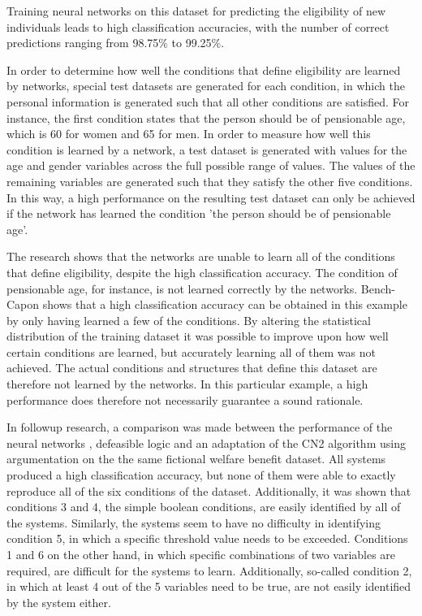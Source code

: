 \documentclass[letterpaper]{article} %
\begin{document}
\noindent Training neural networks on this dataset for predicting the eligibility of new individuals leads to high classification accuracies, with the number of correct predictions ranging from 98.75\% to 99.25\%. 

In order to determine how well the conditions that define eligibility are learned by networks, special test datasets are generated for each condition, in which the personal information is generated such that all other conditions are satisfied. For instance, the first condition states that the person should be of pensionable age, which is 60 for women and 65 for men. In order to measure how well this condition is learned by a network, a test dataset is generated with values for the age and gender variables across the full possible range of values. The values of the remaining variables are generated such that they satisfy the other five conditions. In this way, a high performance on the resulting test dataset can only be achieved if the network has learned the condition 'the person should be of pensionable age'.

The research shows that the networks are unable to learn all of the conditions that define eligibility, despite the high classification accuracy. The condition of pensionable age, for instance, is not learned correctly by the networks. Bench-Capon shows that a high classification accuracy can be obtained in this example by only having learned a few of the conditions. By altering the statistical distribution of the training dataset it was possible to improve upon how well certain conditions are learned, but accurately learning all of them was not achieved. The actual conditions and structures that define this dataset are therefore not learned by the networks. In this particular example, a high performance does therefore not necessarily guarantee a sound rationale.

In followup research, a comparison was made between the performance of the neural networks \cite{bench1993neural},  defeasible logic \cite{johnston2003induction} and an adaptation of the CN2 algorithm using argumentation \cite{movzina2005argument} on the the same fictional welfare benefit dataset. All systems produced a high classification accuracy, but none of them were able to exactly reproduce all of the six conditions of the dataset. Additionally, it was shown that conditions 3 and 4, the simple boolean conditions, are easily identified by all of the systems. Similarly, the systems seem to have no difficulty in identifying condition 5, in which a specific threshold value needs to be exceeded. Conditions 1 and 6 on the other hand, in which specific combinations of two variables are required, are difficult for the systems to learn.  Additionally, so-called condition 2, in which at least 4 out of the 5 variables need to be true, are not easily identified by the system either. 
\end{document}
